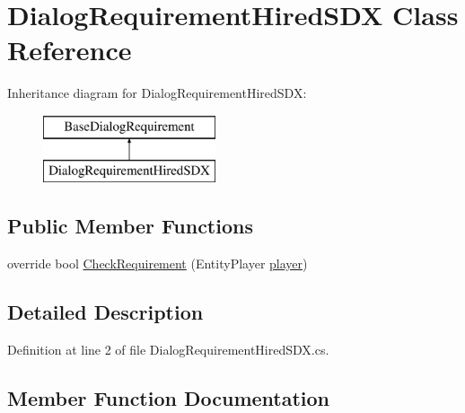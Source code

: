 \hypertarget{class_dialog_requirement_hired_s_d_x}{}\section{Dialog\+Requirement\+Hired\+S\+DX Class Reference}
\label{class_dialog_requirement_hired_s_d_x}
Inheritance diagram for Dialog\+Requirement\+Hired\+S\+DX\+:\begin{figure}[H]
\begin{center}
\leavevmode
\includegraphics[height=2.000000cm]{class_dialog_requirement_hired_s_d_x}
\end{center}
\end{figure}
\subsection*{Public Member Functions}
\begin{DoxyCompactItemize}
\item 
override bool \mbox{\hyperlink{class_dialog_requirement_hired_s_d_x_a67ae324d864d3ee4d39c0f40e72874b7}{Check\+Requirement}} (Entity\+Player \mbox{\hyperlink{_sphere_i_i_01_music_01_boxes_2_config_2_localization_8txt_a4e2cb8aeff651600ea1cc57fe5a929a4}{player}})
\end{DoxyCompactItemize}


\subsection{Detailed Description}


Definition at line 2 of file Dialog\+Requirement\+Hired\+S\+D\+X.\+cs.



\subsection{Member Function Documentation}
\mbox{\label{class_dialog_requirement_hired_s_d_x_a67ae324d864d3ee4d39c0f40e72874b7}} 
